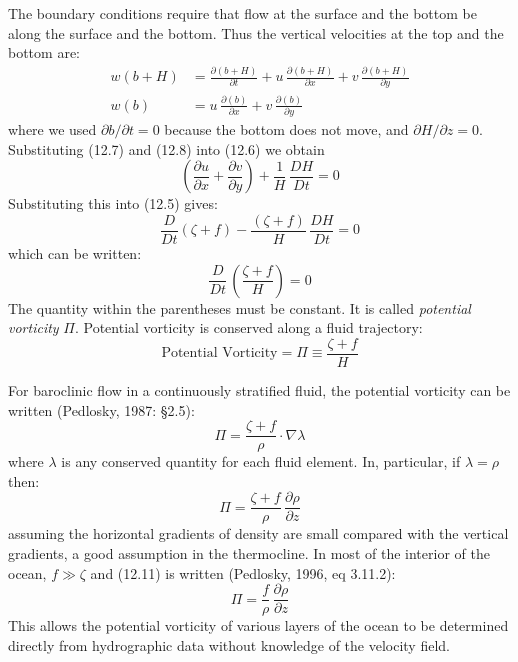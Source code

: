 The boundary conditions require that flow at the surface and the
bottom be along the surface and the bottom. Thus the vertical
velocities at the top and the bottom are:
\begin{align}
w(b+H) &= \frac{\partial{(b+H)}}{\partial{t}} + u\,\frac{\partial{(b+H)}}{\partial{x}}+v\, \frac{\partial{(b+H)}}{\partial{y}} \\
w(b) &= u\,\frac{\partial{(b)}}{\partial{x}}+v\,\frac{\partial{(b)}}{\partial{y}}
\end{align}
where we used $\partial{b}/\partial{t} = 0$ because the bottom does
not move, and $\partial{H}/\partial{z} = 0$. Substituting (12.7) and (12.8)
into (12.6) we obtain
\begin{displaymath}
\left( \frac{\partial{u}}{\partial{x}} + \frac{\partial{v}}{\partial{y}}\right) + \frac{1}{H}\,\frac{DH}{Dt} = 0
\end{displaymath}
Substituting this into (12.5) gives:
\begin{displaymath}
\frac{D}{Dt}\left(\zeta +f  \right) -\frac{\left(\zeta +f
\right)}{H}\,\frac{DH}{Dt} = 0
\end{displaymath}
which can be written:
\begin{displaymath}
\frac{D }{Dt}\,\left( \frac{\zeta + f}{H} \right) = 0
\end{displaymath}
The quantity within the parentheses must be constant. It is called
\textit{potential vorticity}
$\Pi$. Potential vorticity is conserved along a fluid trajectory:
\begin{equation}
\boxed{\text{Potential Vorticity} = \Pi \equiv \frac{\zeta + f}{H} }
\end{equation}

For baroclinic flow in a continuously stratified fluid, the potential
vorticity can be written (Pedlosky, 1987: \S 2.5):
\begin{equation}
\Pi = \frac{\zeta + f}{\rho} \cdot \nabla \lambda
\end{equation}
where $\lambda$ is any conserved quantity for each fluid element. In,
particular, if $\lambda = \rho$ then:
\begin{equation}
\Pi = \frac{\zeta + f}{\rho}\,\frac{\partial{\rho}}{\partial{z}}
\end{equation}
assuming the horizontal gradients of density are small compared with
the vertical gradients, a good assumption in the
thermocline. In most of the interior of the ocean,
$f \gg \zeta$ and (12.11) is written (Pedlosky, 1996, eq 3.11.2):
\begin{equation}
\Pi = \frac{f}{\rho}\,\frac{\partial{\rho}}{\partial{z}}
\end{equation}
This allows the potential vorticity of various layers of the ocean to
be determined directly from hydrographic data without knowledge of the velocity
field.

